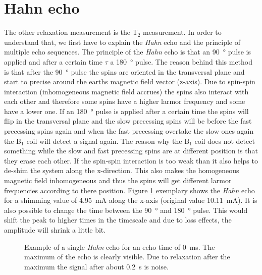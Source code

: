 \section{Hahn echo}
\label{sec:Hahnecho}
The other relaxation measurement is the T$_2$ measurement. In order to understand that, we first have to explain the \textit{Hahn} echo and the principle of multiple echo sequences.\newline
The principle of the \textit{Hahn} echo is that an \SI{90}{\degree} pulse is applied and after a certain time $\tau$ a \SI{180}{\degree} pulse. The reason behind this method is that after the \SI{90}{\degree} pulse the spins are oriented in the transversal plane and start to precise around the earths magnetic field vector (z-axis). Due to spin-spin interaction (inhomogeneous magnetic field accrues) the spins also interact with each other and therefore some spins have a higher larmor frequency and some have a lower one. If an \SI{180}{\degree} pulse is applied after a certain time the spins will flip in the transversal plane and the slow precessing spins will be before the fast precessing spins again and when the fast precessing  overtake the slow ones again the B$_1$ coil will detect a signal again. The reason why the B$_1$ coil does not detect something while the slow and fast precessing spins are at different position is that they erase each other. If the spin-spin interaction is too weak than it also helps to de-shim the system along the x-direction. This also makes the homogeneous magnetic field inhomogeneous and thus the spins will get different larmor frequencies according to there position.\newline
Figure \ref{fig:Echobeispeilsignal} exemplary shows the \textit{Hahn} echo for a shimming value of \SI{4.95}{\milli \ampere} along the x-axis (original value \SI{10.11}{\milli \ampere}). It is also possible to change the time between the \SI{90}{\degree} and \SI{180}{\degree} pulse. This would shift the peak to higher times in the timescale and due to loss effects, the amplitude will shrink a little bit.
\begin{figure}[H]
    \centering
    
    \caption[Example of a single \textit{Hahn} echo for an echo time of \SI{0}{\milli \second}.]{Example of a single \textit{Hahn} echo for an echo time of \SI{0}{\milli \second}. The maximum of the echo is clearly visible. Due to relaxation after the maximum the signal after about \SI{0.2}{\second} is noise.}
    \label{fig:Echobeispeilsignal}
\end{figure}
